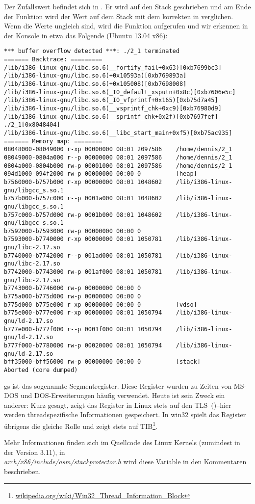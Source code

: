 

Der Zufallswert befindet sich in .
Er wird auf den Stack geschrieben und am Ende der Funktion wird der Wert auf dem Stack mit dem korrekten  in
 verglichen.
Wenn die Werte ungleich sind, wird die Funktion  aufgerufen und wir erkennen in der Konsole in
etwa das Folgende (Ubuntu 13.04 x86):

\begin{lstlisting}
*** buffer overflow detected ***: ./2_1 terminated
======= Backtrace: =========
/lib/i386-linux-gnu/libc.so.6(__fortify_fail+0x63)[0xb7699bc3]
/lib/i386-linux-gnu/libc.so.6(+0x10593a)[0xb769893a]
/lib/i386-linux-gnu/libc.so.6(+0x105008)[0xb7698008]
/lib/i386-linux-gnu/libc.so.6(_IO_default_xsputn+0x8c)[0xb7606e5c]
/lib/i386-linux-gnu/libc.so.6(_IO_vfprintf+0x165)[0xb75d7a45]
/lib/i386-linux-gnu/libc.so.6(__vsprintf_chk+0xc9)[0xb76980d9]
/lib/i386-linux-gnu/libc.so.6(__sprintf_chk+0x2f)[0xb7697fef]
./2_1[0x8048404]
/lib/i386-linux-gnu/libc.so.6(__libc_start_main+0xf5)[0xb75ac935]
======= Memory map: ========
08048000-08049000 r-xp 00000000 08:01 2097586    /home/dennis/2_1
08049000-0804a000 r--p 00000000 08:01 2097586    /home/dennis/2_1
0804a000-0804b000 rw-p 00001000 08:01 2097586    /home/dennis/2_1
094d1000-094f2000 rw-p 00000000 00:00 0          [heap]
b7560000-b757b000 r-xp 00000000 08:01 1048602    /lib/i386-linux-gnu/libgcc_s.so.1
b757b000-b757c000 r--p 0001a000 08:01 1048602    /lib/i386-linux-gnu/libgcc_s.so.1
b757c000-b757d000 rw-p 0001b000 08:01 1048602    /lib/i386-linux-gnu/libgcc_s.so.1
b7592000-b7593000 rw-p 00000000 00:00 0
b7593000-b7740000 r-xp 00000000 08:01 1050781    /lib/i386-linux-gnu/libc-2.17.so
b7740000-b7742000 r--p 001ad000 08:01 1050781    /lib/i386-linux-gnu/libc-2.17.so
b7742000-b7743000 rw-p 001af000 08:01 1050781    /lib/i386-linux-gnu/libc-2.17.so
b7743000-b7746000 rw-p 00000000 00:00 0
b775a000-b775d000 rw-p 00000000 00:00 0
b775d000-b775e000 r-xp 00000000 00:00 0          [vdso]
b775e000-b777e000 r-xp 00000000 08:01 1050794    /lib/i386-linux-gnu/ld-2.17.so
b777e000-b777f000 r--p 0001f000 08:01 1050794    /lib/i386-linux-gnu/ld-2.17.so
b777f000-b7780000 rw-p 00020000 08:01 1050794    /lib/i386-linux-gnu/ld-2.17.so
bff35000-bff56000 rw-p 00000000 00:00 0          [stack]
Aborted (core dumped)
\end{lstlisting}

gs ist das sogenannte Segmentregister. Diese Register wurden zu Zeiten von MS-DOS und DOS-Erweiterungen häufig
verwendet. Heute ist sein Zweck ein anderer:
Kurz gesagt, zeigt das  Register in Linux stets auf den \ac{TLS}~()--hier werden threadspezifische
Informationen gespeichert. In win32 spielt das  Register übrigens die gleiche Rolle und zeigt stets auf
\ac{TIB}\footnote{\href{https://en.wikipedia.org/wiki/Win32_Thread_Information_Block}{wikipedia.org/wiki/Win32\_Thread\_Information\_Block}}.

Mehr Informationen finden sich im Quellcode des Linux Kernels (zumindest in der Version 3.11), in\\
\emph{arch/x86/include/asm/stackprotector.h} wird diese Variable in den Kommentaren beschrieben.



